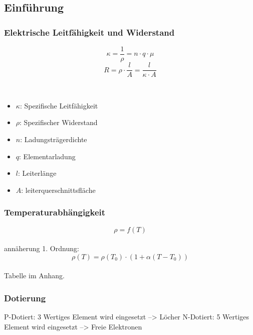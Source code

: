 \documentclass[margin=normal]{tex/hsrzf}
\begin{document}
\subsection{Einführung}
\begin{multicols}{2}
  \subsubsection*{Elektrische Leitfähigkeit und Widerstand}
  $$\kappa = \frac{1}{\rho} = n \cdot q \cdot \mu$$
  $$R = \rho \cdot \frac{l}{A} = \frac{l}{\kappa \cdot A} $$
  {\\ \tiny \begin{itemize}[leftmargin=*]
        \item $\kappa$: Spezifische Leitfähigkeit
        \item $\rho$: Spezifischer Widerstand
        \item $n$: Ladungsträgerdichte
        \item $q$: Elementarladung
        \item $l$: Leiterlänge
        \item $A$: leiterquerschnittsfläche
      \end{itemize}}

  \subsubsection*{Temperaturabhängigkeit}
  $$\rho = f(T)$$
  \\annäherung 1. Ordnung:
  $$\rho(T) = \rho(T_0) \cdot (1+ \alpha(T-T_0))$$
  {\\ \tiny Tabelle im Anhang.}

  \subsubsection{Dotierung}
  P-Dotiert: 3 Wertiges Element wird eingesetzt --> Löcher
  N-Dotiert: 5 Wertiges Element wird eingesetzt --> Freie Elektronen
\end{multicols}
\end{document}
